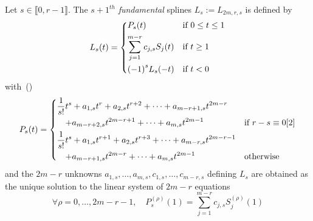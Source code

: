 \begin{deftn}\label{def:fundamental-r}
  Let $s \in \llbracket 0, r-1\rrbracket$. The ${s+1}^{th}$ \emph{fundamental} splines $L_s := L_{2m,r,s}$ is defined by  
  \begin{equation}
    L_s(t) = 
    \begin{dcases} 
      P_s(t) & \text{if} \ 0 \leq t \leq 1 \\
      \sum_{j=1}^{m-r} c_{j,s} S_j(t) & \text{if} \ t \geq 1 \\
      {(-1)}^s L_s(-t) & \text{if} \ t < 0
    \end{dcases}
  \end{equation}
  with~(\cite[(7.13)]{LS73})
  \begin{equation}
    P_s(t) = \begin{dcases} \frac{1}{s!}t^s + a_{1,s}t^r + a_{2,s}t^{r+2} + \cdots + a_{m-r+1,s}t^{2m-r} \\ \quad +  
      a_{m-r+2,s} t^{2m-r+1} + \cdots + a_{m,s} t^{2m-1} & \text{if $r-s \equiv 0[2]$} \\
      \frac{1}{s!}t^s + a_{1,s}t^{r+1} + a_{2,s}t^{r+3} + \cdots + a_{m-r,s}t^{2m-r-1} \\
      \quad + a_{m-r+1,s} t^{2m-r} + \cdots + a_{m,s} t^{2m-1} & \text{otherwise}
   \end{dcases}
  \end{equation}
  and the $2m-r$ unknowns $a_{1,s}, \ldots, a_{m,s}, c_{1,s}, \ldots, c_{m-r,s}$ defining $L_s$ are obtained as the 
  unique solution to the linear system of $2m-r$ equations
  \begin{equation}
   \forall \rho=0, \ldots, 2m-r-1, \quad P_s^{(\rho)}(1) =\sum_{j=1}^{m-r} c_{j,s} S_j^{(\rho)}(1)
  \end{equation}
\end{deftn}

